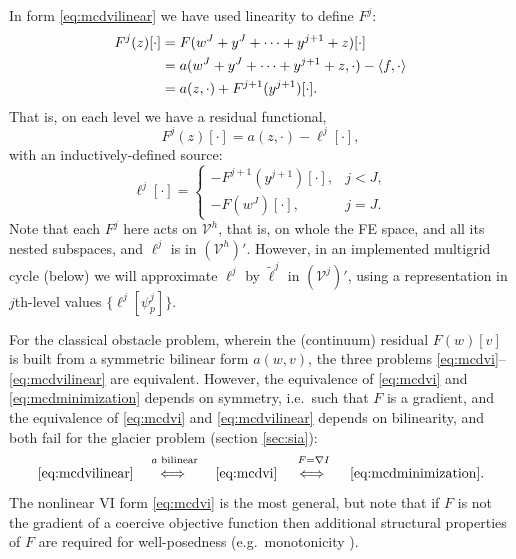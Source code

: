 \documentclass[letterpaper,final,12pt,reqno]{amsart}
\theoremstyle{claim}
\newcommand{\grad}{\nabla}
\newcommand{\ip}[2]{\left<#1,#2\right>}
\numberwithin{equation}{section}
\numberwithin{figure}{section}
\numberwithin{table}{section}
\numberwithin{theorem}{section}
\begin{document}
In form \eqref{eq:mcdvilinear} we have used linearity to define $F^j$:
\begin{align}
  F^j(z)[\cdot] &= F(w^J+y^J+\dots+y^{j+1}+z)[\cdot] \label{eq:residuallinearlevelderive} \\
                &= a(w^J+y^J+\dots+y^{j+1}+z,\cdot) - \ip{f}{\cdot} \notag \\
                &= a(z,\cdot) + F^{j+1}(y^{j+1})[\cdot]. \notag
\end{align}
That is, on each level we have a residual functional,
\begin{equation}
  F^j(z)[\cdot] = a(z,\cdot) - \ell^j[\cdot],  \label{eq:residuallinearlevel}
\end{equation}
with an inductively-defined source:
\begin{equation}
  \ell^j[\cdot] = \begin{cases} - F^{j+1}(y^{j+1})[\cdot], & j < J, \\
                                - F(w^J)[\cdot], & j = J. \end{cases} \label{eq:rhslinearlevel}
\end{equation}
Note that each $F^j$ here acts on $\mathcal{V}^h$, that is, on whole the FE space, and all its nested subspaces, and $\ell^j$ is in $(\mathcal{V}^h)'$.  However, in an implemented multigrid cycle (below) we will approximate $\ell^j$ by $\tilde \ell^j$ in $(\mathcal{V}^j)'$, using a representation in $j$th-level values $\{\ell^j[\psi_p^j]\}$.

For the classical obstacle problem, wherein the (continuum) residual $F(w)[v]$ is built from a symmetric bilinear form $a(w,v)$, the three problems \eqref{eq:mcdvi}--\eqref{eq:mcdvilinear} are equivalent.  However, the equivalence of \eqref{eq:mcdvi} and \eqref{eq:mcdminimization} depends on symmetry, i.e.~such that $F$ is a gradient, and the equivalence of \eqref{eq:mcdvi} and \eqref{eq:mcdvilinear} depends on bilinearity, and both fail for the glacier problem (section \ref{sec:sia}):
   $$\eqref{eq:mcdvilinear} \quad \stackrel{a \text{ bilinear}}{\iff\strut} \quad \eqref{eq:mcdvi} \quad \stackrel{F=\grad I}{\iff\strut} \quad \eqref{eq:mcdminimization}.$$
The nonlinear VI form \eqref{eq:mcdvi} is the most general, but note that if $F$ is not the gradient of a coercive objective function then additional structural properties of $F$ are required for well-posedness (e.g.~monotonicity \cite{Bueler2020,KinderlehrerStampacchia1980}).
\end{document}
